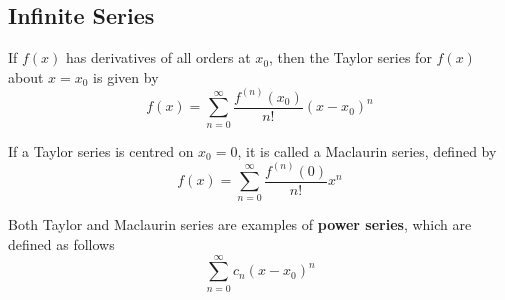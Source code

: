 \documentclass{article}
\begin{document}
\subsection{Infinite Series}
\begin{definition}
    If $f(x)$  has derivatives of all orders at $x_0$, then the Taylor series for $f(x)$ about $x=x_0$ is given by
    \begin{equation*}
        f(x) = \sum_{n=0}^{\infty} \frac{f^{\left( n \right)}(x_0)}{n!}\left( x-x_0 \right)^n
    \end{equation*}
\end{definition}
\begin{definition}
    If a Taylor series is centred on $x_0=0$, it is called a Maclaurin series, defined by
    \begin{equation*}
        f(x) = \sum_{n=0}^{\infty} \frac{f^{\left( n \right)}(0)}{n!} x^n
    \end{equation*}
\end{definition}
\begin{definition}
    Both Taylor and Maclaurin series are examples of \textbf{power series}, which are defined as follows
    \begin{equation*}
        \sum_{n=0}^{\infty} c_n\left( x-x_0 \right)^n
    \end{equation*}
\end{definition}
\end{document}
